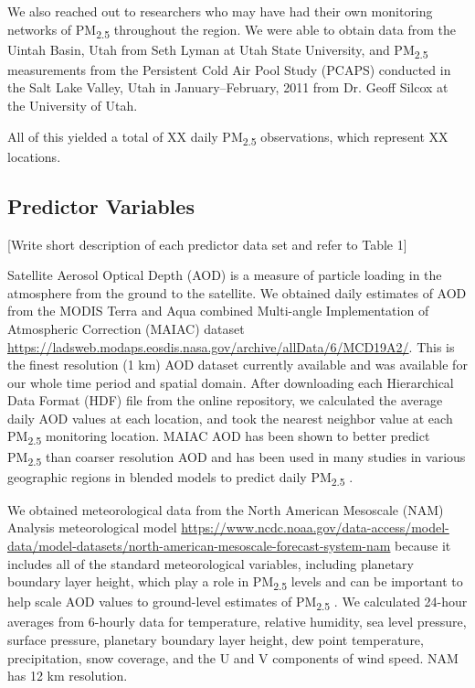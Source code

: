 \documentclass[english]{article}
\begin{document}
We also reached out to researchers who may have had their own monitoring networks of PM\textsubscript{2.5} throughout the region. We were able to obtain data from the Uintah Basin, Utah from Seth Lyman at Utah State University, and PM\textsubscript{2.5} measurements from the Persistent Cold Air Pool Study (PCAPS) \cite{Silcox_wintertime_2012} conducted in the Salt Lake Valley, Utah in January--February, 2011 from Dr. Geoff Silcox at the University of Utah.  

All of this yielded a total of XX daily PM\textsubscript{2.5} observations, which represent XX locations. %

\subsection*{Predictor Variables}

[Write short description of each predictor data set and refer to Table 1]

Satellite Aerosol Optical Depth (AOD) is a measure of particle loading in the atmosphere from the ground to the satellite. We obtained daily estimates of %
AOD from the MODIS Terra and Aqua combined Multi-angle Implementation of Atmospheric Correction (MAIAC) dataset \url{https://ladsweb.modaps.eosdis.nasa.gov/archive/allData/6/MCD19A2/}. This is the finest resolution (1 km) AOD dataset currently available and was available for our whole time period and spatial domain. After downloading each 
Hierarchical Data Format 
(HDF) file from the online repository, we calculated the average daily AOD values at each location, and took the nearest neighbor value at each PM\textsubscript{2.5} monitoring location. MAIAC AOD has been shown to better predict PM\textsubscript{2.5} than coarser resolution AOD \cite{chudnovsky_spatial_2012} and has been used in many studies in various geographic regions in blended models to predict daily PM\textsubscript{2.5} \cite{lee_benefits_2019, geng_satellite-based_2018-1, li_using_2018}.

We obtained meteorological data from the North American Mesoscale (NAM) Analysis meteorological model \url{https://www.ncdc.noaa.gov/data-access/model-data/model-datasets/north-american-mesoscale-forecast-system-nam} because it includes all of the standard meteorological variables, including planetary boundary layer height, which play a role in PM\textsubscript{2.5} levels and can be important to help scale AOD values to ground-level estimates of PM\textsubscript{2.5} \cite{liu_estimating_2005}. We calculated 24-hour averages from 6-hourly data for temperature, relative humidity, sea level pressure, surface pressure, planetary boundary layer height, dew point temperature, precipitation, snow coverage, and the U and V components of wind speed. NAM has 12 km resolution.
\end{document}
